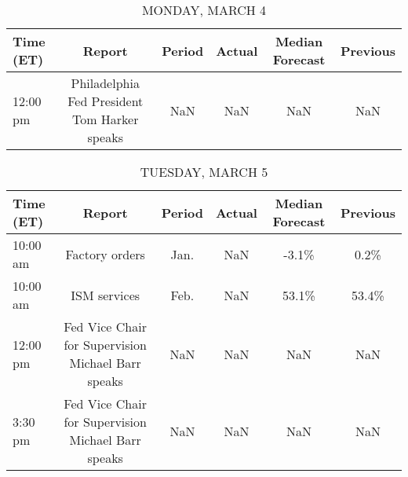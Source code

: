 \documentclass{article}%
\begin{document}
%
\normalsize%


\begin{table}[htbp]%
\caption{MONDAY, MARCH 4}%
\centering%
\begin{adjustbox}{width=1\textwidth}%
\begin{tabular}{lccccc}
\toprule
Time (ET) &                                       Report & Period & Actual & Median Forecast & Previous \\
\midrule
 12:00 pm & Philadelphia Fed President Tom Harker speaks &    NaN &    NaN &             NaN &      NaN \\
\bottomrule
\end{tabular}
%
\end{adjustbox}%
\end{table}

%


\begin{table}[htbp]%
\caption{TUESDAY, MARCH 5}%
\centering%
\begin{adjustbox}{width=1\textwidth}%
\begin{tabular}{lccccc}
\toprule
Time (ET) &                                             Report & Period & Actual & Median Forecast & Previous \\
\midrule
 10:00 am &                                     Factory orders &   Jan. &    NaN &           -3.1\% &     0.2\% \\
 10:00 am &                                       ISM services &   Feb. &    NaN &           53.1\% &    53.4\% \\
 12:00 pm & Fed Vice Chair for Supervision Michael Barr speaks &    NaN &    NaN &             NaN &      NaN \\
  3:30 pm & Fed Vice Chair for Supervision Michael Barr speaks &    NaN &    NaN &             NaN &      NaN \\
\bottomrule
\end{tabular}
%
\end{adjustbox}%
\end{table}

%
\end{document}
